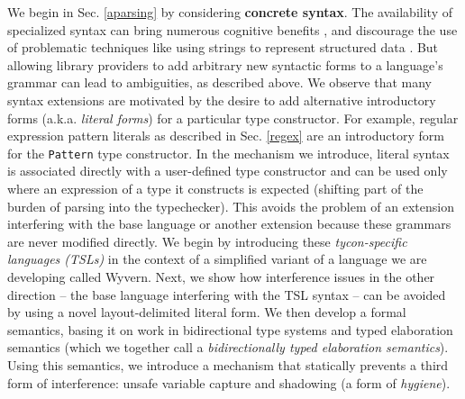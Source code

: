 We begin in Sec. \ref{aparsing} by considering \textbf{concrete syntax}. The availability of specialized syntax can bring numerous cognitive benefits \cite{green1996usability}, and discourage the use of problematic techniques like using strings to represent structured data \cite{Bravenboer:2007:PIA:1289971.1289975}. But allowing library providers to add arbitrary new syntactic forms to a language's grammar can lead to ambiguities, as described above. We observe that many syntax extensions are motivated by the desire to add alternative  introductory forms (a.k.a. \emph{literal forms}) for a particular type constructor. For example, regular expression pattern literals as described in Sec. \ref{regex} are an introductory form for the \verb|Pattern| type constructor.  In the mechanism we introduce, literal syntax is associated directly with a user-defined type constructor and can be used only where an expression of a type it constructs is expected (shifting part of the burden of parsing into the typechecker). This avoids the problem of an extension interfering with the base language or another extension  because these grammars are never modified directly. We begin by introducing these \emph{tycon-specific languages (TSLs)} in the context of a simplified variant of a language we are developing called Wyvern. Next, we show how interference issues in the other direction -- the base language interfering with  the TSL syntax -- can be avoided by using a novel layout-delimited literal form. We then develop a formal semantics, basing it on work in bidirectional type systems and typed elaboration semantics (which we together call a \emph{bidirectionally typed elaboration semantics}). Using this semantics, we introduce a mechanism that statically prevents a third form of interference: unsafe variable capture and shadowing (a form of \emph{hygiene}).%

